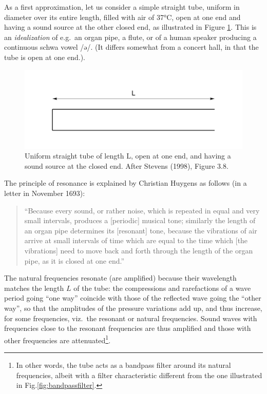 \documentclass[
]{book}
\begin{document}
As a first approximation, let us consider a simple straight tube, uniform in diameter over its entire length, filled with air of 37°C, open at one end and having a sound source at the other closed end, as illustrated in Figure \ref{fig:onetube}. This is an \emph{idealization} of e.g.~an organ pipe, a flute, or of a human speaker producing a continuous schwa vowel /ə/. (It differs somewhat from a concert hall, in that the tube is open at one end.).

\begin{figure}

{\centering \includegraphics{figures/onetube} 

}

\caption{Uniform straight tube of length L, open at one end, and having a sound source at the closed end. After Stevens (1998), Figure 3.8.}\label{fig:onetube}
\end{figure}

The principle of resonance is explained by Christian Huygens as follows (in a letter in November 1693):

\begin{quote}
``Because every sound, or rather noise, which is repeated in equal and very small intervals, produces a {[}periodic{]} musical tone; similarly the length of an organ pipe determines its {[}resonant{]} tone, because the vibrations of air arrive at small intervals of time which are equal to the time which {[}the vibrations{]} need to move back and forth through the length of the organ pipe, as it is closed at one end.'' \citep[571, transl. HQ]{Huygens_1905}
\end{quote}

The natural frequencies resonate (are amplified) because their wavelength matches the length \(L\) of the tube: the compressions and rarefactions of a wave period going ``one way'' coincide with those of the reflected wave going the ``other way'', so that the amplitudes of the pressure variations add up, and thus increase, for some frequencies, viz.~the resonant or natural frequencies. Sound waves with frequencies close to the resonant frequencies are thus amplified and those with other frequencies are attenuated\footnote{In other words, the tube acts as a bandpass filter around its natural frequencies, albeit with a filter characteristic different from the one illustrated in Fig.\ref{fig:bandpassfilter}.}.
\end{document}
